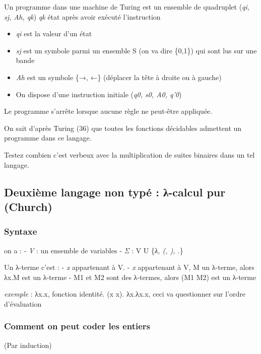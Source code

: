 \documentclass[]{article}
\providecommand{\tightlist}{%
  \setlength{\itemsep}{0pt}\setlength{\parskip}{0pt}}
\begin{document}
Un programme dans une machine de Turing est un ensemble de quadruplet
(\emph{qi, sj, Ah, qk}) \emph{qk} état après avoir exécuté l'instruction

\begin{itemize}
\tightlist
\item
  \emph{qi} est la valeur d'un état
\item
  \emph{sj} est un symbole parmi un ensemble S (on va dire \{0,1\}) qui
  sont lus sur une bande
\item
  \emph{Ah} est un symbole \{→, ←\} (déplacer la tête à droite ou à
  gauche)
\item
  On dispose d'une instruction initiale (\emph{q0, s0, A0, q'0})
\end{itemize}

Le programme s'arrête lorsque aucune règle ne peut-être appliquée.

On sait d'après Turing (36) que toutes les fonctions décidables
admettent un programme dans ce langage.

Testez combien c'est verbeux avec la multiplication de suites binaires
dans un tel langage.

\subsection{Deuxième langage non typé : λ-calcul pur
(Church)}\label{deuxiuxe8me-langage-non-typuxe9-ux3bb-calcul-pur-church}

\subsubsection{\texorpdfstring{\textbf{Syntaxe}}{Syntaxe}}\label{syntaxe}

on a : - \emph{V} : un ensemble de variables - \emph{Σ} : V U \{\emph{λ,
(, ), .}\}

Un λ-terme c'est : - \emph{x} appartenant à V. - \emph{x} appartenant à
V, M un λ-terme, alors λx.M est un λ-terme - M1 et M2 sont des λ-termes,
alors (M1 M2) est un λ-terme

\emph{exemple} : λx.x, fonction identité. (x x). λx.λx.x, ceci va
questionner sur l'ordre d'évaluation

\subsubsection{Comment on peut coder les
entiers}\label{comment-on-peut-coder-les-entiers}

(Par induction)
\end{document}
